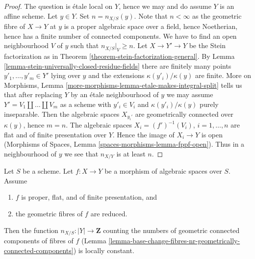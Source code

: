 \begin{proof}
The question is \'etale local on $Y$, hence we may and do assume $Y$
is an affine scheme. Let $y \in Y$. Set $n = n_{X/S}(y)$.
Note that $n < \infty$ as the geometric fibre of $X \to Y$ at $y$
is a proper algebraic space over a field, hence Noetherian, hence
has a finite number of connected components.
We have to find an open neighbourhood $V$ of $y$ such that $n_{X/S}|_V \geq n$.
Let $X \to Y' \to Y$ be the Stein factorization as in
Theorem \ref{theorem-stein-factorization-general}.
By Lemma \ref{lemma-stein-universally-closed-residue-fields}
there are finitely many points
$y'_1, \ldots, y'_m \in Y'$ lying over $y$
and the extensions $\kappa(y'_i)/\kappa(y)$ are finite.
More on Morphisms, Lemma \ref{more-morphisms-lemma-etale-makes-integral-split}
tells us that after replacing $Y$ by an \'etale neighbourhood
of $y$ we may assume $Y' = V_1 \amalg \ldots \amalg V_m$ as a scheme
with $y'_i \in V_i$ and $\kappa(y'_i)/\kappa(y)$ purely inseparable.
Then the algebraic spaces $X_{y_i'}$ are geometrically connected over
$\kappa(y)$, hence $m = n$. The algebraic spaces
$X_i = (f')^{-1}(V_i)$, $i = 1, \ldots, n$
are flat and of finite presentation over $Y$. Hence the image of $X_i \to Y$
is open (Morphisms of Spaces, Lemma \ref{spaces-morphisms-lemma-fppf-open}).
Thus in a neighbourhood of $y$ we see that $n_{X/Y}$ is
at least $n$.
\end{proof}

\begin{lemma}
\label{lemma-proper-flat-geom-red}
Let $S$ be a scheme.
Let $f : X \to Y$ be a morphism of algebraic spaces over $S$. Assume
\begin{enumerate}
\item $f$ is proper, flat, and of finite presentation, and
\item the geometric fibres of $f$ are reduced.
\end{enumerate}
Then the function $n_{X/S} : |Y| \to \mathbf{Z}$
counting the numbers of geometric connected components
of fibres of $f$
(Lemma \ref{lemma-base-change-fibres-nr-geometrically-connected-components})
is locally constant.
\end{lemma}

